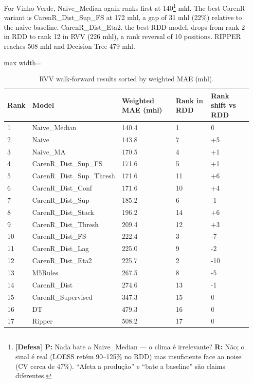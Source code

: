 For Vinho Verde, Naive\_Median again ranks first at 140\footnote{\textbf{[Defesa] P:} Nada bate a Naive\_Median --- o clima é irrelevante? \textbf{R:} Não; o sinal é real (LOESS retém 90--125\% no RDD) mas insuficiente face ao noise (CV cerca de 47\%). ``Afeta a produção'' e ``bate a baseline'' são claims diferentes.} mhl. The best CarenR variant is CarenR\_Dist\_Sup\_FS at 172 mhl, a gap of 31 mhl (22\%) relative to the naive baseline. CarenR\_Dist\_Eta2, the best RDD model, drops from rank 2 in RDD to rank 12 in RVV (226 mhl), a rank reversal of 10 positions. RIPPER reaches 508 mhl and Decision Tree 479 mhl.

\begin{table}[htbp]
  \centering
  \caption{RVV walk-forward results sorted by weighted MAE (mhl).}\label{tab:ch5a_2}
  \small
  \begin{adjustbox}{max width=\textwidth}
    \begin{tabularx}{\textwidth}{l|p{4.5cm}|l|l|X}
  \toprule
  Rank & Model & Weighted MAE (mhl) & Rank in RDD & Rank shift vs RDD \\
  \midrule
  1 & Naive\_Median & 140.4 & 1 & 0 \\
  2 & Naive & 143.8 & 7 & +5 \\
  3 & Naive\_MA & 170.5 & 4 & +1 \\
  4 & CarenR\_Dist\_Sup\_FS & 171.6 & 5 & +1 \\
  5 & CarenR\_Dist\_Sup\_Thresh & 171.6 & 11 & +6 \\
  6 & CarenR\_Dist\_Conf & 171.6 & 10 & +4 \\
  7 & CarenR\_Dist\_Sup & 185.2 & 6 & -1 \\
  8 & CarenR\_Dist\_Stack & 196.2 & 14 & +6 \\
  9 & CarenR\_Dist\_Thresh & 209.4 & 12 & +3 \\
  10 & CarenR\_Dist\_FS & 222.4 & 3 & -7 \\
  11 & CarenR\_Dist\_Lag & 225.0 & 9 & -2 \\
  12 & CarenR\_Dist\_Eta2 & 225.7 & 2 & -10 \\
  13 & M5Rules & 267.5 & 8 & -5 \\
  14 & CarenR\_Dist & 274.6 & 13 & -1 \\
  15 & CarenR\_Supervised & 347.3 & 15 & 0 \\
  16 & DT & 479.3 & 16 & 0 \\
  17 & Ripper & 508.2 & 17 & 0 \\
  \bottomrule
\end{tabularx}
  \end{adjustbox}

\end{table}


